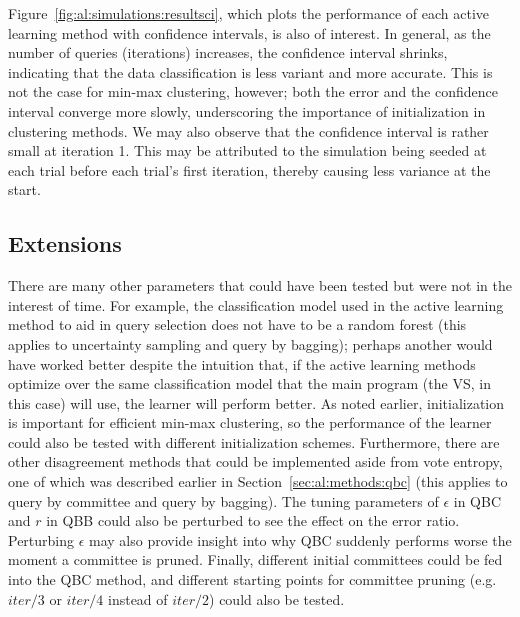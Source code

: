 Figure~\ref{fig:al:simulations:resultsci}, which plots the performance of each 
active learning method with confidence intervals, is also of interest. In 
general, as the number of queries (iterations) increases, the confidence 
interval shrinks, indicating that the data classification is less variant and 
more accurate. This is not the case for min-max clustering, however; both the 
error and the confidence interval converge more slowly, underscoring the 
importance of initialization in clustering methods. 
We may also observe that the confidence interval is rather small at iteration 
1. This may be attributed to the simulation being seeded at each trial before 
each trial's first iteration, thereby causing less variance at the start.

\subsection{Extensions}
\label{sec:al:extensions}

There are many other parameters that could have been tested but were 
not in the interest of time. For 
example, the classification model used in the active learning method to aid in 
query selection does not have to be a random forest 
(this applies to uncertainty sampling and query by bagging); perhaps another 
would have worked better despite 
the intuition that, if the active learning methods optimize over the same 
classification model that the main program (the VS, in this case) will use, the 
learner will perform better. As noted earlier, initialization is important for 
efficient min-max clustering, so the performance of the 
learner could also be tested with different initialization 
schemes. Furthermore, there are other disagreement methods 
that could be implemented aside from vote entropy, one of which was described 
earlier in Section~\ref{sec:al:methods:qbc} (this applies to query by committee 
and query by bagging). The tuning parameters of $\epsilon$ in QBC and $r$ in 
QBB could also be perturbed to see the effect on the error ratio. Perturbing 
$\epsilon$ may also provide insight into why QBC suddenly performs worse the 
moment a committee is pruned. Finally, 
different initial committees could be fed into the QBC method, and different 
starting points for committee pruning (e.g. $iter/3$ or $iter/4$ instead of 
$iter/2$) could also be tested.